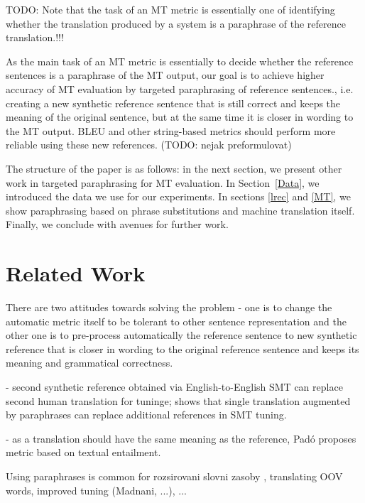 \documentclass[11pt]{article}
\def\Sref#1{Section~\ref{#1}}
\begin{document}
TODO: Note that the task of an MT metric is essentially one of identifying  whether the translation produced by a system is a paraphrase of the reference translation.!!!


As the main task of an MT metric is essentially to decide whether the reference
sentences is a paraphrase of the MT output, our goal is to achieve higher 
accuracy of MT evaluation by targeted paraphrasing of reference sentences., i.e. 
creating a new synthetic reference sentence that is still correct and keeps the 
meaning of the original sentence, but at the same time it is closer in wording 
to the MT output. BLEU and other string-based metrics should perform more 
reliable using these new references. (TODO: nejak preformulovat)

The structure of the paper is as follows: in the next section, we present other
work in targeted paraphrasing for MT evaluation. In \Sref{Data}, we introduced
the data we use for our experiments.  In sections \ref{lrec} and \ref{MT}, 
we show paraphrasing based on phrase substitutions and machine translation 
itself. Finally, we conclude with avenues for further work.

\section{Related Work}
There are two attitudes towards solving the problem - one is to change the 
automatic metric itself to be tolerant to other sentence representation and the
other one is to pre-process automatically the reference sentence to new 
synthetic reference that is closer in wording to the original reference 
sentence and keeps its meaning and grammatical correctness.

\cite{Madnani08} - second synthetic reference obtained via English-to-English 
SMT can replace second human translation for tuninge; shows that single translation
augmented by paraphrases can replace additional references in SMT tuning.

\cite{Pado09} - as a translation should have the same meaning as the 
reference, Padó proposes metric based on textual entailment.

Using paraphrases is common for rozsirovani slovni zasoby , translating OOV words, improved tuning (Madnani, ...), ...
\end{document}
